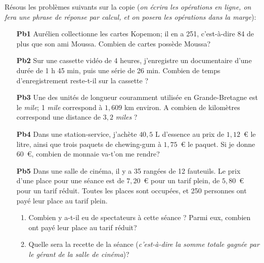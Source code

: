 Résous les problèmes suivants sur la copie (\textit{on écrira les opérations en ligne, on fera une phrase de réponse par calcul, et on posera les opérations dans la marge}):
\begin{enumerate}
\item[\textbf{Pb1}] Aurélien collectionne les cartes Kopemon; il en a 251, c'est-à-dire 84 de plus que son ami Moussa. Combien de cartes possède Moussa?
\item[\textbf{Pb2}] Sur une cassette vidéo de 4 heures, j'enregistre un documentaire d'une durée de 1 h 45 min, puis une série de 26 min. Combien de temps d'enregistrement reste-t-il sur la cassette ? 
\item[\textbf{Pb3}] Une des unités de longueur couramment utilisée en Grande-Bretagne est le \textit{mile}; 1 \textit{mile} correspond à $1,609$ km environ. A combien de kilomètres correspond une distance de $3,2$ \textit{miles} ?
\item[\textbf{Pb4}] Dans une station-service, j'achète $40,5$ L d'essence au prix de $1,12$~\textgreek{\euro} le litre, ainsi que trois paquets de chewing-gum à $1,75$~\textgreek{\euro} le paquet. Si je donne 60~\textgreek{\euro}, combien de monnaie va-t'on me rendre?
\item[\textbf{Pb5}] Dans une salle de cinéma, il y a 35 rangées de 12 fauteuils. Le prix d'une place pour une séance est de $7,20$~\textgreek{\euro} pour un tarif plein, de $5,80$~\textgreek{\euro} pour un tarif réduit. Toutes les places sont occupées, et 250 personnes ont payé leur place au tarif plein.
\begin{enumerate}
\item Combien y a-t-il eu de spectateurs à cette séance ? Parmi eux, combien ont payé leur place au tarif réduit?
\item Quelle sera la recette de la séance (\textit{c'est-à-dire la somme totale gagnée par le gérant de la salle de cinéma})? 
\end {enumerate}
\end{enumerate}
